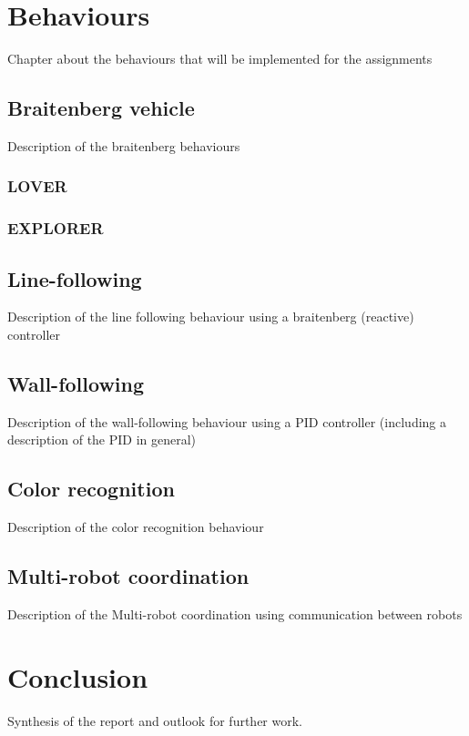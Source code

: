 \documentclass[11pt,a4paper]{report}
\begin{document}
\chapter{Behaviours}
Chapter about the behaviours that will be implemented for the assignments

\section{Braitenberg vehicle}
Description of the braitenberg behaviours

\subsection{LOVER}
\subsection{EXPLORER}


\section{Line-following}
Description of the line following behaviour using a braitenberg (reactive) controller

\section{Wall-following}
Description of the wall-following behaviour using a PID controller (including a description of the PID in general)

\section{Color recognition}
Description of the color recognition behaviour

\section{Multi-robot coordination}
Description of the Multi-robot coordination using communication between robots

\chapter{Conclusion}
Synthesis of the report and outlook for further work.
\end{document}

